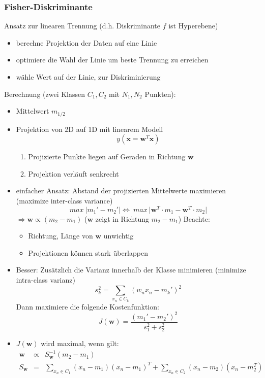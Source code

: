 	\subsubsection{Fisher-Diskriminante}
	Ansatz zur linearen Trennung (d.h. Diskriminante $f$ ist Hyperebene)
	\begin{itemize}
		\item berechne Projektion der Daten auf eine Linie
		\item optimiere die Wahl der Linie um beste Trennung zu erreichen
		\item wähle Wert auf der Linie, zur Diskriminierung
	\end{itemize}
	Berechnung (zwei Klassen $C_1, C_2$ mit $N_1, N_2$ Punkten):
	\begin{itemize}
		\item Mittelwert $m_{1/2}$
		\item Projektion von 2D auf 1D mit linearem Modell
		\begin{equation*}
			y(\pmb{x} = \pmb{w}^T\pmb{x})
		\end{equation*}\vspace*{-5pt}
		\begin{enumerate}[$\hookrightarrow$]
			\item Projizierte Punkte liegen auf Geraden in Richtung $\pmb{w}$
			\item Projektion verläuft senkrecht
		\end{enumerate}
		\item einfacher Ansatz: Abstand der projizierten Mittelwerte maximieren (maximize inter-class variance)
		\begin{equation*}
			max~ \vert m_1'-m_2'\vert \Leftrightarrow~max~\vert\pmb{w}^T\cdot m_1 - \pmb{w}^T\cdot m_2\vert
		\end{equation*}
		$\Rightarrow \pmb{w}\propto (m_2-m_1)$ ($\pmb{w}$ zeigt in Richtung $m_2-m_1$)
		Beachte: 
		\begin{itemize}
			\item Richtung, Länge von $\pmb{w}$ unwichtig
			\item Projektionen können stark überlappen
		\end{itemize}
		\item Besser: Zusätzlich die Varianz innerhalb der Klasse minimieren (minimize intra-class varianz)
		\begin{equation*}
			s_k^2=\sum_{x_n \in C_k} (w_nx_n-m_k')^2
		\end{equation*}
		Dann maximiere die folgende Kostenfunktion:
		\begin{equation*}
			J(\pmb{w}) = \frac{(m_1'-m_2')^2}{s_1^2+s_2^2}
		\end{equation*}
		\item $J(\pmb{w})$ wird maximal, wenn gilt:
		\begin{eqnarray*}
			\pmb{w} &\propto& S_{\pmb{w}}^{-1}(m_2-m_1)\\
			S_{\pmb{w}} &=& \sum_{x_n \in C_1} (x_n-m_1)(x_n-m_1)^T + \sum_{x_n \in C_2}(x_n-m_2)(x_n-m_2^T)
		\end{eqnarray*}
	\end{itemize}
